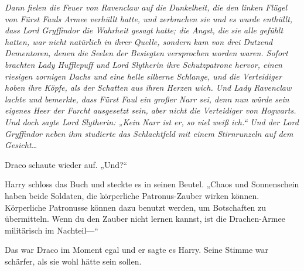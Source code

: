 \emph{Dann fielen die Feuer von Ravenclaw auf die Dunkelheit, die den linken Flügel von Fürst Fauls Armee verhüllt hatte, und zerbrachen sie und es wurde enthüllt, dass Lord Gryffindor die Wahrheit gesagt hatte; die Angst, die sie alle gefühlt hatten, war nicht natürlich in ihrer Quelle, sondern kam von drei Dutzend Dementoren, denen die Seelen der Besiegten versprochen worden waren. Sofort brachten Lady Hufflepuff und Lord Slytherin ihre Schutzpatrone hervor, einen riesigen zornigen Dachs und eine helle silberne Schlange, und die Verteidiger hoben ihre Köpfe, als der Schatten aus ihren Herzen wich. Und Lady Ravenclaw lachte und bemerkte, dass Fürst Faul ein großer Narr sei, denn nun würde sein eigenes Heer der Furcht ausgesetzt sein, aber nicht die Verteidiger von Hogwarts. Und doch sagte Lord Slytherin: „Kein Narr ist er, so viel weiß ich.“ Und der Lord Gryffindor neben ihm studierte das Schlachtfeld mit einem Stirnrunzeln auf dem Gesicht…}

Draco schaute wieder auf. „Und?“

Harry schloss das Buch und steckte es in seinen Beutel. „Chaos und Sonnenschein haben beide Soldaten, die körperliche Patronus-Zauber wirken können. Körperliche Patronusse können dazu benutzt werden, um Botschaften zu übermitteln. Wenn du den Zauber nicht lernen kannst, ist die Drachen-Armee militärisch im Nachteil—“

Das war Draco im Moment egal und er sagte es Harry. Seine Stimme war schärfer, als sie wohl hätte sein sollen.

